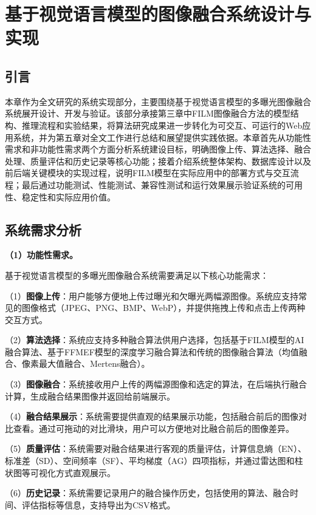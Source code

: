 \section{基于视觉语言模型的图像融合系统设计与实现}\label{ch:system}

\subsection{引言}\label{sec:ch4_intro}

本章作为全文研究的系统实现部分，主要围绕基于视觉语言模型的多曝光图像融合系统展开设计、开发与验证。该部分承接第三章中FILM图像融合方法的模型结构、推理流程和实验结果，将算法研究成果进一步转化为可交互、可运行的Web应用系统，并为第五章对全文工作进行总结和展望提供实践依据。本章首先从功能性需求和非功能性需求两个方面分析系统建设目标，明确图像上传、算法选择、融合处理、质量评估和历史记录等核心功能；接着介绍系统整体架构、数据库设计以及前后端关键模块的实现过程，说明FILM模型在实际应用中的部署方式与交互流程；最后通过功能测试、性能测试、兼容性测试和运行效果展示验证系统的可用性、稳定性和实际应用价值。

\subsection{系统需求分析}\label{sec:requirements}

\textbf{（1）功能性需求。}

基于视觉语言模型的多曝光图像融合系统需要满足以下核心功能需求：

（1）\textbf{图像上传}：用户能够方便地上传过曝光和欠曝光两幅源图像。系统应支持常见的图像格式（JPEG、PNG、BMP、WebP），并提供拖拽上传和点击上传两种交互方式。

（2）\textbf{算法选择}：系统应支持多种融合算法供用户选择，包括基于FILM模型的AI融合算法、基于FFMEF模型的深度学习融合算法和传统的图像融合算法（均值融合、像素最大值融合、Mertens融合）。

（3）\textbf{图像融合}：系统接收用户上传的两幅源图像和选定的算法，在后端执行融合计算，生成融合结果图像并返回给前端展示。

（4）\textbf{融合结果展示}：系统需要提供直观的结果展示功能，包括融合前后的图像对比查看。通过可拖动的对比滑块，用户可以方便地对比融合前后的图像差异。

（5）\textbf{质量评估}：系统需要对融合结果进行客观的质量评估，计算信息熵（EN）、标准差（SD）、空间频率（SF）、平均梯度（AG）四项指标，并通过雷达图和柱状图等可视化方式直观展示。

（6）\textbf{历史记录}：系统需要记录用户的融合操作历史，包括使用的算法、融合时间、评估指标等信息，支持导出为CSV格式。

